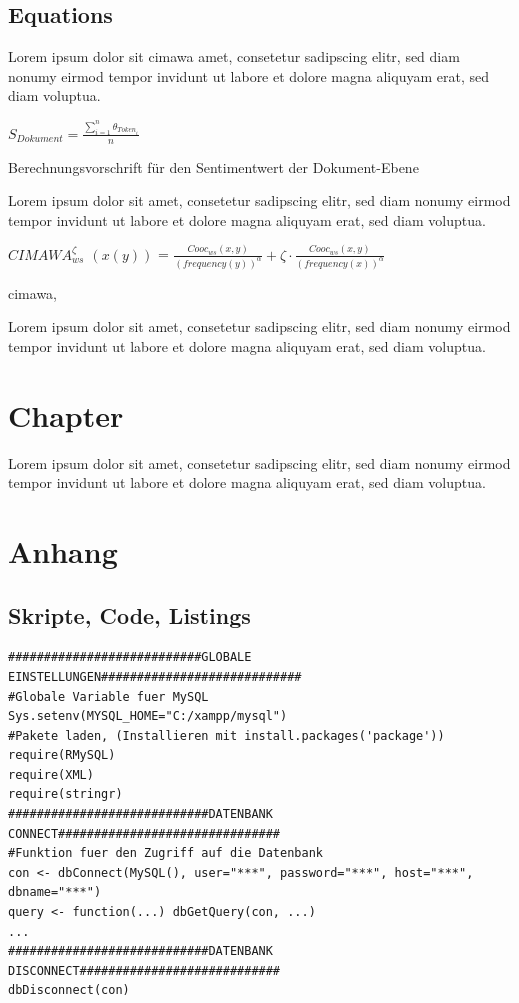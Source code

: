 \documentclass[
        ngerman,
        paper=a4,
        numbers=noendperiod,
]{scrreprt}
\begin{document}
\section{Equations}
Lorem ipsum dolor sit \ac{cimawa} amet, consetetur sadipscing elitr, sed diam nonumy eirmod tempor invidunt ut labore et dolore magna aliquyam erat, sed diam voluptua.
\begin{xequation-} 
\centering $S_{Dokument}= \frac{\sum_{i=1}^n{\theta_{{Token}_i}}}{n}$
\caption[Berechnungsvorschrift für den Sentimentwert der Dokument-Ebene]{Berechnungsvorschrift für den Sentimentwert der Dokument-Ebene} 
\end{xequation-} 
Lorem ipsum dolor sit amet, consetetur sadipscing elitr, sed diam nonumy eirmod tempor invidunt ut labore et dolore magna aliquyam erat, sed diam voluptua.
\begin{xequation-} 
\centering \textit{$CIMAWA_{ws}^\zeta$ $(x(y))$} = $\frac{Cooc_{ws}(x,y)}{(frequency(y))^\alpha} + \zeta \cdot \frac{Cooc_{ws}(x,y)}{(frequency(x))^\alpha}$
\caption[CIMAWA]{\ac{cimawa}, \cite []{eff70}} 
\end{xequation-}
Lorem ipsum dolor sit amet, consetetur sadipscing elitr, sed diam nonumy eirmod tempor invidunt ut labore et dolore magna aliquyam erat, sed diam voluptua.
\chapter{Chapter}
Lorem ipsum dolor sit amet, consetetur sadipscing elitr, sed diam nonumy eirmod tempor invidunt ut labore et dolore magna aliquyam erat, sed diam voluptua.
\appendix 
\chapter{Anhang}
\label{chapter:Anhang}%
\section{Skripte, Code, Listings}
\label{section:scripts} %
\begin{lstlisting}
###########################GLOBALE EINSTELLUNGEN############################
#Globale Variable fuer MySQL
Sys.setenv(MYSQL_HOME="C:/xampp/mysql")
#Pakete laden, (Installieren mit install.packages('package'))
require(RMySQL)
require(XML)
require(stringr)
############################DATENBANK CONNECT###############################
#Funktion fuer den Zugriff auf die Datenbank
con <- dbConnect(MySQL(), user="***", password="***", host="***", dbname="***")
query <- function(...) dbGetQuery(con, ...)
...
############################DATENBANK DISCONNECT############################
dbDisconnect(con)
\end{lstlisting}
\end{document}
